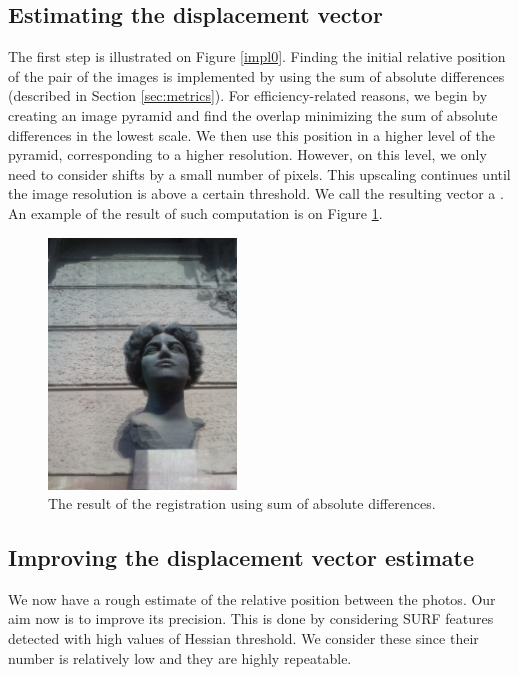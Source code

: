 \subsection{Estimating the displacement vector}
The first step is illustrated on Figure \ref{impl0}.
Finding the initial relative position of the pair of the images is implemented by using the sum of absolute differences (described in Section \ref{sec:metrics}).
For efficiency-related reasons, we begin by creating an image pyramid and find the overlap minimizing the sum of absolute differences in the lowest scale. 
We then use this position in a higher level of the pyramid, corresponding to a higher resolution. 
However, on this level, we only need to consider shifts by a small number of pixels. 
This upscaling continues until the image resolution is above a certain threshold. 
We call the resulting vector a .
An example of the result of such computation is on Figure \ref{emaover}.

\begin{figure}[H]
\centering
\includegraphics[width=5cm]{img/ema_overlap.png}
\caption{The result of the registration using sum of absolute differences.}
\label{emaover}
\end{figure} 

\subsection{Improving the displacement vector estimate}
\label{sec:improving}

We now have a rough estimate of the relative position between the photos. 
Our aim now is to improve its precision.
This is done by considering SURF features detected with high values of Hessian threshold. 
We consider these since their number is relatively low and they are highly repeatable. 

